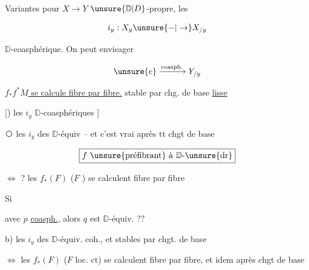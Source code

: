 Variantes pour $X\to Y$ $\unsure{\mathbb D|D}$-propre,  les

\[i_y:X_y\unsure{\mathord{-}|\to}X_{/y}\]

$\mathbb D$-coasphérique. On peut envisager


\[\unsure{e}\xrightarrow{\text{coasph.}}Y_{/y}\]


\uline{$f_*f^*M$  se calcule fibre par fibre.} stable par chg. de base \uline{lisse}

[) les $i_y$ $\mathbb D$-coasphériques ]

\textcircled{\scriptsize{}} les $i_y$ des $\mathbb D$-équiv --  et c'est vrai après tt chgt de base


\[\boxed{\text{$f$ \unsure{préfibrant} à $\mathbb D$-\unsure{dr}}}\]

$\Longleftrightarrow$ ? les $f_*(F)$ ($F$ ) se calculent fibre par fibre

Si


avec $p$ \uline{coasph.}, alors $q$ est $\mathbb D$-équiv. ??

b) les $i_y$ des $\mathbb D$-équiv. coh., et stables par chgt. de base

\deleted{\unsure{$\Longleftrightarrow$}}

$\Longleftrightarrow$ les $f_*(F)$ ($F$ loc. ct) se calculent fibre par fibre, et idem après chgt de base

